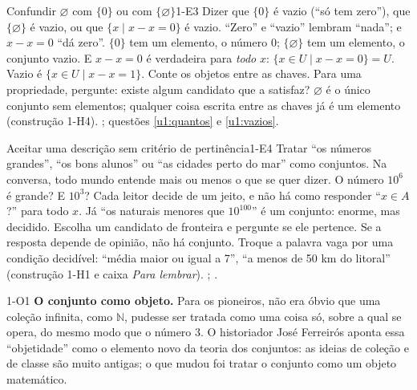 \begin{erro}{Confundir $\varnothing$ com $\{0\}$ ou com $\{\varnothing\}$}{1-E3}
 Dizer que $\{0\}$ é vazio (\enquote{só tem zero}), que $\{\varnothing\}$ é vazio, ou que $\{x\mid x-x=0\}$ é vazio.
 \enquote{Zero} e \enquote{vazio} lembram \enquote{nada}; e $x-x=0$ \enquote{dá zero}.
 $\{0\}$ tem um elemento, o número 0; $\{\varnothing\}$ tem um elemento, o conjunto vazio. E $x-x=0$ é verdadeira para \emph{todo} $x$: $\{x\in U\mid x-x=0\}=U$. Vazio é $\{x\in U\mid x-x=1\}$.
 Conte os objetos entre as chaves. Para uma propriedade, pergunte: existe algum candidato que a satisfaz?
 $\varnothing$ é o único conjunto sem elementos; qualquer coisa escrita entre as chaves já é um elemento (construção 1-H4).
 ; questões \ref{u1:quantos} e \ref{u1:vazios}.
\end{erro}

\begin{erro}{Aceitar uma descrição sem critério de pertinência}{1-E4}
 Tratar \enquote{os números grandes}, \enquote{os bons alunos} ou \enquote{as cidades perto do mar} como conjuntos.
 Na conversa, todo mundo entende mais ou menos o que se quer dizer.
 O número $10^6$ é grande? E $10^3$? Cada leitor decide de um jeito, e não há como responder \enquote{$x\in A$?} para todo $x$. Já \enquote{os naturais menores que $10^{100}$} é um conjunto: enorme, mas decidido.
 Escolha um candidato de fronteira e pergunte se ele pertence. Se a resposta depende de opinião, não há conjunto.
 Troque a palavra vaga por uma condição decidível: \enquote{média maior ou igual a 7}, \enquote{a menos de 50 km do litoral} (construção 1-H1 e caixa \emph{Para lembrar}).
 ; .
\end{erro}

\Observacoes

\begin{obs}{1-O1}
\textbf{O conjunto como objeto.} Para os pioneiros, não era óbvio que uma coleção infinita, como $\mathbb{N}$, pudesse ser tratada como uma coisa só, sobre a qual se opera, do mesmo modo que o número 3. O historiador José Ferreirós aponta essa \enquote{objetidade} como o elemento novo da teoria dos conjuntos: as ideias de coleção e de classe são muito antigas; o que mudou foi tratar o conjunto como um objeto matemático.
\end{obs}

